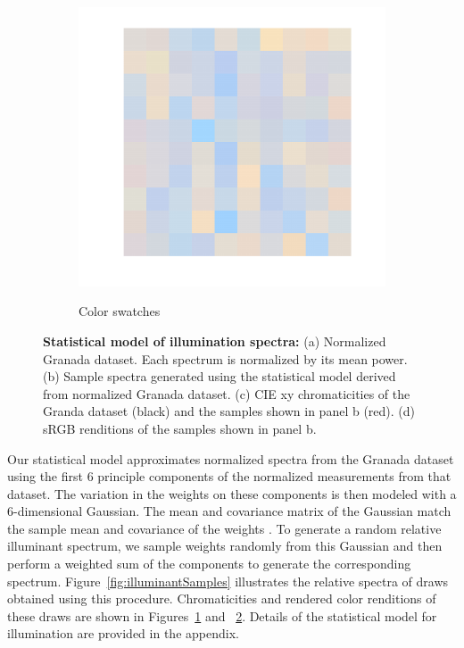 \documentclass{jov}
\begin{document}
\begin{figure}
\begin{subfigure}[b]{0.24 \textwidth}
        \label{fig:xyDiagram}
        \end{subfigure}
      	\begin{subfigure}[b]{0.24 \textwidth}
    \centering
        \caption{Color swatches}
        \includegraphics[width=\textwidth]{../FiguresDraft5/Figure6/Figure6_d.pdf}
        \label{fig:sRGBIlluminant}
    \end{subfigure}
    \caption{{\bf Statistical model of illumination spectra:} (a) Normalized Granada dataset. Each spectrum is normalized by its mean power. (b) Sample spectra generated using the statistical model derived from normalized Granada dataset. (c) CIE xy chromaticities of the Granda dataset (black) and the samples shown in panel b (red). (d) sRGB renditions of the samples shown in panel b.}
\label{fig:illuminant}
\end{figure}

Our statistical model approximates normalized spectra from the Granada dataset using the first 6 principle components of the normalized measurements from that dataset.
The variation in the weights on these components is then modeled with a 6-dimensional Gaussian.
The mean and covariance matrix of the Gaussian match the sample mean and covariance of the weights \cite{BrainardFreeman}. 
To generate a random relative illuminant spectrum, we sample weights randomly from this Gaussian and then perform a weighted sum of the components to generate the corresponding spectrum.
Figure~\ref{fig:illuminantSamples} illustrates the relative spectra of draws obtained using this procedure.
Chromaticities and rendered color renditions of these draws are shown in Figures~\ref{fig:xyDiagram} and ~\ref{fig:sRGBIlluminant}.
Details of the statistical model for illumination are provided in the appendix.
\end{document}
